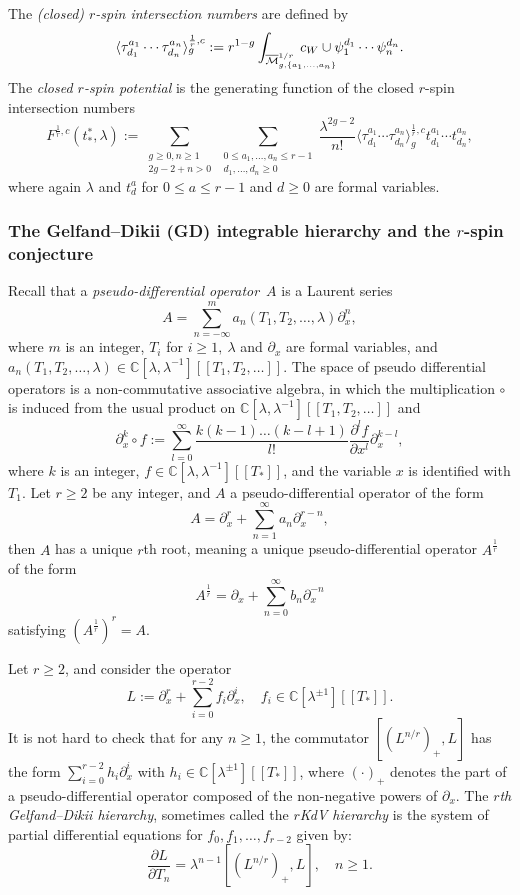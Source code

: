 \documentclass[11pt]{amsart}
\theoremstyle{definition}
\theoremstyle{remark}
\newcommand{\M}{\ensuremath{\overline{\mathcal{M}}}}
\renewcommand{\d}{\ensuremath{\partial}}
\newcommand{\<}{\left<}
\renewcommand{\>}{\right>}
\numberwithin{equation}{section}
\def\C{{\mathbb C}}
\begin{document}
The {\it (closed) $r$-spin intersection numbers} are defined by
\begin{gather}\label{eq:closed r-spin}
\langle\tau^{a_1}_{d_1}\cdots\tau^{a_n}_{d_n}\rangle^{\frac{1}{r},c}_g:=r^{1-g}\int_{\M^{1/r}_{g,\{a_1, \ldots, a_n\}}} \hspace{-1cm} c_W \cup \psi_1^{d_1} \cdots \psi_n^{d_n}.
\end{gather}
The \emph{closed $r$-spin potential}
is the generating function of the closed $r$-spin intersection numbers\[
F^{\frac{1}{r},c}(t^*_*,\lambda):=\sum_{\substack{g \geq 0, n \geq 1\\2g-2+n>0}} \sum_{\substack{0 \leq a_1, \ldots, a_n \leq r-1\\ d_1, \ldots, d_n \geq 0}} \frac{\lambda^{2g-2}}{n!}\langle\tau^{a_1}_{d_1}\cdots\tau^{a_n}_{d_n}\rangle^{\frac{1}{r},c}_g t^{a_1}_{d_1} \cdots t^{a_n}_{d_n},
\]
where again $\lambda$ and $t^a_d$  for $0\le a\le r-1$ and $d\ge 0$ are formal variables. 



\subsubsection{The Gelfand--Dikii (GD) integrable hierarchy and the $r$-spin conjecture}\label{subsub:rGD_closed}

Recall that a {\it pseudo-differential operator}~$A$ is a Laurent series
\[
A=\sum_{n=-\infty}^m a_n(T_1,T_2,\ldots,\lambda)\partial_x^n,
\]
where $m$ is an integer,  $T_i$ for $i\geq 1,~\lambda$ and $\partial_x$ are formal variables, and $a_n(T_1,T_2,\ldots,\lambda)\in\C[\lambda,\lambda^{-1}][[T_1,T_2,\ldots]]$.     The space of pseudo differential operators is a non-commutative associative algebra, in which the multiplication $\circ$ is induced from the usual product on $\C[\lambda,\lambda^{-1}][[T_1,T_2,\ldots]]$ and 
\[
\d_x^k\circ f:=\sum_{l=0}^\infty\frac{k(k-1)\ldots(k-l+1)}{l!}\frac{\d^lf}{\d x^l}\d_x^{k-l},
\]
where $k$ is an integer, $f\in\mathbb C[\lambda,\lambda^{-1}][[T_*]]$, and the variable $x$ is identified with $T_1$. Let $r\geq 2$ be any integer, and $A$ a pseudo-differential operator of the form
\[
A=\partial_x^r+\sum_{n=1}^\infty a_n\partial_x^{r-n},
\]
then $A$ has a unique $r$th root, meaning a unique pseudo-differential operator $A^{\frac{1}{r}}$ of the form
\[
A^{\frac{1}{r}}=\partial_x+\sum_{n=0}^\infty b_n\partial_x^{-n}
\]
satisfying $\left(A^{\frac{1}{r}}\right)^r=A$.

Let $r\geq 2$, and consider the operator
$$
L:=\partial_x^r+\sum_{i=0}^{r-2}f_i\partial_x^i,\quad f_i\in\C[\lambda^{\pm1}][[T_*]].
$$
It is not hard to check that for any $n\geq 1$, the commutator $[(L^{n/r})_+,L]$ has the form $\sum_{i=0}^{r-2}h_i\partial_x^i$ with $h_i\in\C[\lambda^{\pm1}][[T_*]]$, where $(\cdot)_+$ denotes the part of a pseudo-differential operator composed of the non-negative powers of $\partial_x$. The {\it $r$th Gelfand--Dikii hierarchy}, sometimes called the \emph{$r$KdV hierarchy} is the system of partial differential equations for $f_0,f_1,\ldots,f_{r-2}$ given by:
\begin{equation}
    \label{eq:GD_hier}
\frac{\partial L}{\partial T_n}=\lambda^{n-1}[(L^{n/r})_+,L],\quad n\geq 1.
\end{equation}
\end{document}
